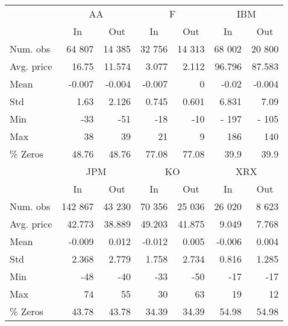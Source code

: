 \begin{singlespace}
\begin{tabular}{lrrrrrr} \toprule 
 & \multicolumn{2}{c}{AA}& \multicolumn{2}{c}{F}& \multicolumn{2}{c}{IBM} \\ 
\cmidrule(r){2-3} \cmidrule(r){4-5} \cmidrule(r){6-7} &  \multicolumn{1}{c}{In}&  \multicolumn{1}{c}{ Out}&  \multicolumn{1}{c}{In}&  \multicolumn{1}{c}{ Out}&  \multicolumn{1}{c}{In}&  \multicolumn{1}{c}{ Out} \\ \midrule 
 Num. obs&64 807&14 385&32 756&14 313&68 002&20 800 \\ 
Avg. price&16.75&11.574&3.077&2.112&96.796&87.583 \\ 
Mean&-0.007&-0.004&-0.007&0&-0.02&-0.004 \\ 
Std&1.63&2.126&0.745&0.601&6.831&7.09 \\ 
Min&-33&-51&-18&-10&- 197&- 105 \\ 
Max&38&39&21&9& 186& 140 \\ 
\% Zeros&48.76&48.76&77.08&77.08&39.9&39.9 \\ \midrule 
 & \multicolumn{2}{c}{JPM}& \multicolumn{2}{c}{KO}& \multicolumn{2}{c}{XRX} \\ 
\cmidrule(r){2-3} \cmidrule(r){4-5} \cmidrule(r){6-7} &  \multicolumn{1}{c}{ In}&  \multicolumn{1}{c}{Out}&  \multicolumn{1}{c}{In}&  \multicolumn{1}{c}{Out}&  \multicolumn{1}{c}{In}&  \multicolumn{1}{c}{Out} \\ \midrule 
 Num. obs& 142 867&43 230&70 356&25 036&26 020&8 623 \\ 
Avg. price&42.773&38.889&49.203&41.875&9.049&7.768 \\ 
Mean&-0.009&0.012&-0.012&0.005&-0.006&0.004 \\ 
Std&2.368&2.779&1.758&2.734&0.816&1.285 \\ 
Min&-48&-40&-33&-50&-17&-17 \\ 
Max&74&55&30&63&19&12 \\ 
\% Zeros&43.78&43.78&34.39&34.39&54.98&54.98 \\ \bottomrule 
\end{tabular}
\end{singlespace}